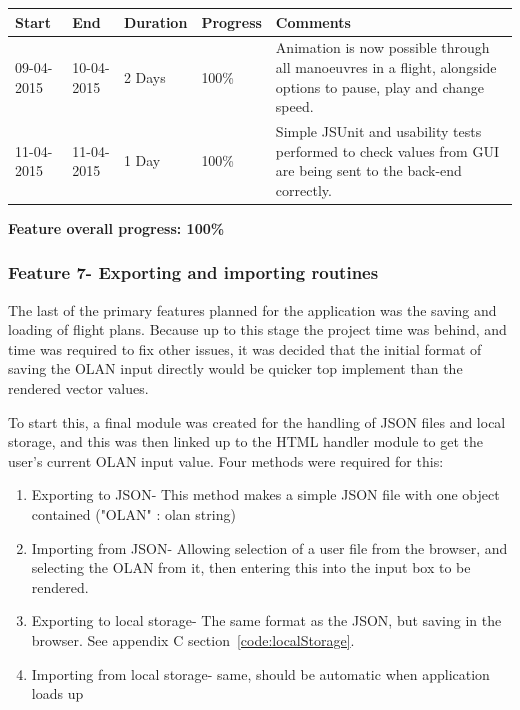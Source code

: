 \begin{table}[h]
\begin{tabular}{|l|l|l|l|p{7cm}|}
\hline
\textbf{Start} & \textbf{End} & \textbf{Duration} & \textbf{Progress} & \textbf{Comments}                                                                                                     \\ \hline
09-04-2015     & 10-04-2015   & 2 Days            & 100\%             &  Animation is now possible through all manoeuvres in a flight, alongside options to pause, play and change speed.\\ \hline
11-04-2015     & 11-04-2015   & 1 Day            & 100\%             &  Simple JSUnit and usability tests performed to check values from GUI are being sent to the back-end correctly.\\ \hline
\end{tabular}
\end{table}

\textbf{Feature overall progress: 100\%}

\subsubsection{Feature 7- Exporting and importing routines}
The last of the primary features planned for the application was the saving and loading of flight plans. Because up to this stage the project time was behind, and time was required to fix other issues, it was decided that the initial format of saving the OLAN input directly would be quicker top implement than the rendered vector values. 

To start this, a final module was created for the handling of JSON files and local storage, and this was then linked up to the HTML handler module to get the user's current OLAN input value. Four methods were required for this:
\begin{enumerate}
  \item Exporting to JSON- This method makes a simple JSON file with one object contained ("OLAN" : olan string)
  \item Importing from JSON- Allowing selection of a user file from the browser, and selecting the OLAN from it, then entering this into the input box to be rendered.
  \item Exporting to local storage- The same format as the JSON, but saving in the browser. See appendix C section~\ref{code:localStorage}.
  \item Importing from local storage- same, should be automatic when application loads up
\end{enumerate}

